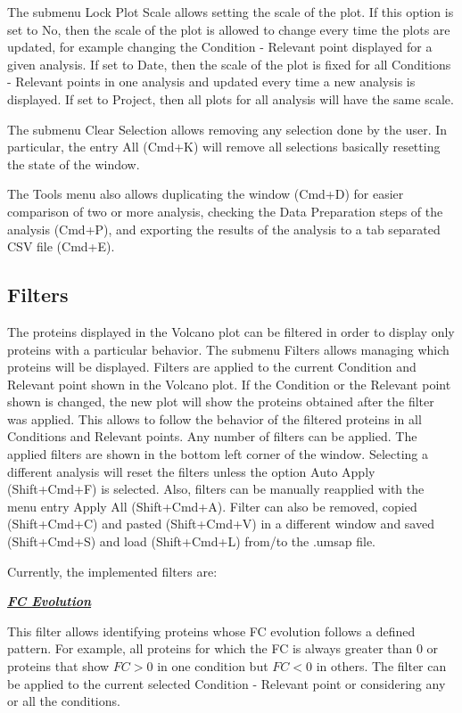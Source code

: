 The submenu Lock Plot Scale allows setting the scale of the plot. If this option
is set to No, then the scale of the plot is allowed to change every time the plots
are updated, for example changing the Condition - Relevant point displayed for a
given analysis. If set to Date, then the scale of the plot is fixed for all Conditions
- Relevant points in one analysis and updated every time a new analysis is displayed.
If set to Project, then all plots for all analysis will have the same scale.

The submenu Clear Selection allows removing any selection done by the user. In
particular, the entry All (Cmd+K) will remove all selections basically resetting
the state of the window.

The Tools menu also allows duplicating the window (Cmd+D) for easier comparison of
two or more analysis, checking the Data Preparation steps of the analysis (Cmd+P),
and exporting the results of the analysis to a tab separated CSV file (Cmd+E).

\newpage
\subsection{Filters}

The proteins displayed in the Volcano plot can be filtered in order to display only
proteins with a particular behavior. The submenu Filters allows managing which 
proteins will be displayed. Filters are applied to the current Condition and Relevant
point shown in the Volcano plot. If the Condition or the Relevant point shown is
changed, the new plot will show the proteins obtained after the filter was applied.
This allows to follow the behavior of the filtered proteins in all Conditions and
Relevant points. Any number of filters can be applied. The applied filters are shown
in the bottom left corner of the window. Selecting a different analysis will reset
the filters unless the option Auto Apply (Shift+Cmd+F) is selected. Also, filters
can be manually reapplied with the menu entry Apply All (Shift+Cmd+A). Filter can
also be removed, copied (Shift+Cmd+C) and pasted (Shift+Cmd+V) in a different window
and saved (Shift+Cmd+S) and load (Shift+Cmd+L) from/to the .umsap file.

Currently, the implemented filters are:

\textbf{\textit{\underline{FC Evolution}}}

This filter allows identifying proteins whose FC evolution follows a defined pattern.
For example, all proteins for which the FC is always greater than \num{0} or proteins
that show $FC > 0$ in one condition but $FC < 0$ in others. The filter can be applied
to the current selected Condition - Relevant point or considering any or all the
conditions.

